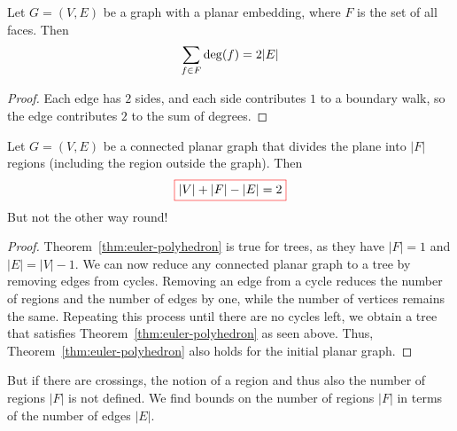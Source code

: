 \begin{lemma}[Faceshaking]\label{lem:faceshaking}
Let \(G=(V,E)\) be a graph with a planar embedding, where \(F\) is the set of all faces.
Then
\[
\sum_{f \in F} \operatorname{deg}(f)=2|E| \qedhere
\]
\end{lemma}
\begin{proof}
Each edge has \(2\) sides, and each side contributes \(1\) to a boundary walk, so the edge contributes \(2\) to the sum of degrees.
\end{proof}

\begin{theorem}\label{thm:euler-polyhedron}
Let \(G=(V,E)\) be a connected planar graph that divides the plane into \(|F|\) regions (including the region outside the graph).
Then
\[
\fcolorbox{red}{white}{$%
|V| + |F| - |E| = 2
$}
\]
But not the other way round!
\end{theorem}
\begin{proof}
Theorem~\ref{thm:euler-polyhedron} is true for trees, as they have \(|F|=1\) and \(|E|=|V|-1\).
We can now reduce any connected planar graph to a tree by removing edges from cycles.
Removing an edge from a cycle reduces the number of regions and the number of edges by one, while the number of vertices remains the same.
Repeating this process until there are no cycles left, we obtain a tree that satisfies Theorem~\ref{thm:euler-polyhedron} as seen above.
Thus, Theorem~\ref{thm:euler-polyhedron} also holds for the initial planar graph.
\end{proof}
But if there are crossings, the notion of a region and thus also the number of regions \(|F|\) is not defined.
We find bounds on the number of regions \(|F|\) in terms of the number of edges \(|E|\).





